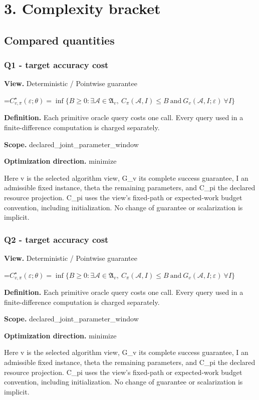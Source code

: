 \documentclass[10pt,a4paper]{article}
\newcommand{\AtlasMath}[1]{\par\begingroup\centering\setbox0=\hbox{$\displaystyle #1$}\ifdim\wd0>1.4\linewidth\typeout{ATLAS WIDE FORMULA: \the\wd0}\fi\ifdim\wd0>\linewidth\resizebox{\linewidth}{!}{\box0}\else\box0\fi\par\endgroup}
\begin{document}
\section{3. Complexity bracket}
\subsection{Compared quantities}
\subsubsection{Q1 - target accuracy cost}
\textbf{View.} Deterministic / Pointwise guarantee

\AtlasMath{C^\star_{v,\pi}(\varepsilon;\theta)=\inf\{B\ge0:\exists\mathcal A\in\mathfrak A_v,\ C_\pi(\mathcal A,I)\le B\ \text{and}\ G_v(\mathcal A,I;\varepsilon)\ \forall I\}}
\textbf{Definition.} Each primitive oracle query costs one call. Every query used in a finite-difference computation is charged separately.

\textbf{Scope.} declared\_joint\_parameter\_window

\textbf{Optimization direction.} minimize

Here v is the selected algorithm view, G\_v its complete success guarantee, I an admissible fixed instance, theta the remaining parameters, and C\_pi the declared resource projection. C\_pi uses the view's fixed-path or expected-work budget convention, including initialization. No change of guarantee or scalarization is implicit.

\subsubsection{Q2 - target accuracy cost}
\textbf{View.} Deterministic / Pointwise guarantee

\AtlasMath{C^\star_{v,\pi}(\varepsilon;\theta)=\inf\{B\ge0:\exists\mathcal A\in\mathfrak A_v,\ C_\pi(\mathcal A,I)\le B\ \text{and}\ G_v(\mathcal A,I;\varepsilon)\ \forall I\}}
\textbf{Definition.} Each primitive oracle query costs one call. Every query used in a finite-difference computation is charged separately.

\textbf{Scope.} declared\_joint\_parameter\_window

\textbf{Optimization direction.} minimize

Here v is the selected algorithm view, G\_v its complete success guarantee, I an admissible fixed instance, theta the remaining parameters, and C\_pi the declared resource projection. C\_pi uses the view's fixed-path or expected-work budget convention, including initialization. No change of guarantee or scalarization is implicit.
\end{document}
